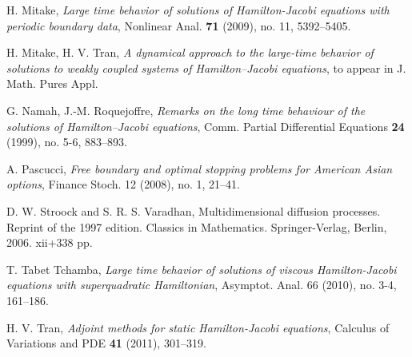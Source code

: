 \documentclass[12pt,reqno]{amsart}
\theoremstyle{plain}
\theoremstyle{remark}
\numberwithin{equation}{section}
\begin{document}
\begin{thebibliography}{30}
H. Mitake, 
\emph{Large time behavior of solutions of Hamilton-Jacobi equations with periodic boundary data}, Nonlinear Anal. 
{\bf 71} (2009), no. 11, 5392--5405. 

H. Mitake, H. V. Tran, 
\emph{A dynamical approach to the large-time behavior of solutions to weakly coupled systems of Hamilton--Jacobi equations},
to appear in J. Math. Pures Appl. 

G. Namah, J.-M. Roquejoffre, 
\emph{Remarks on the long time behaviour of the solutions of Hamilton--Jacobi equations}, 
Comm. Partial Differential Equations {\bf 24} (1999), no. 5-6, 883--893. 

A. Pascucci, 
\emph{Free boundary and optimal stopping problems for American Asian options}, 
Finance Stoch. 12 (2008), no. 1, 21--41. 

D. W. Stroock and  S. R. S. Varadhan,
Multidimensional diffusion processes. 
Reprint of the 1997 edition. Classics in Mathematics. Springer-Verlag, Berlin, 2006. xii+338 pp.

T. Tabet Tchamba, 
\emph{Large time behavior of solutions of viscous Hamilton-Jacobi equations with superquadratic Hamiltonian}, 
Asymptot. Anal. 66 (2010), no. 3-4, 161--186.

H. V. Tran, 
\emph{Adjoint methods for static Hamilton-Jacobi equations},
 Calculus of Variations and PDE {\bf 41} (2011), 301--319. 
\end {thebibliography}
\end{document}
